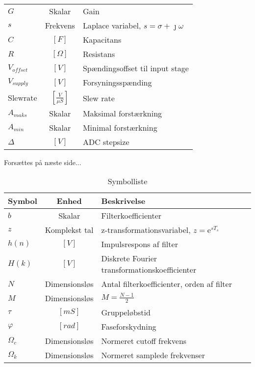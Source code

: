 \begin{table}[ht!]
\begin{threeparttable}
\begin{tabular}{l c p{}}
			$G$ & Skalar & Gain \\
			$s$ & Frekvens & Laplace variabel, $s = \sigma + \jmath \omega$ \\
			$C$ & $\left[\si{F}\right]$ & Kapacitans\\
			$R$ & $\left[\si{\Omega}\right]$ & Resistans\\
			$V_{offset}$ & $\left[\si{V}\right]$ & Spændingsoffset til input stage \\
			$V_{supply}$ & $\left[\si{V}\right]$ & Forsyningsspænding \\
			$\mathrm{Slew rate}$ & $\left[\si{\frac{V}{\mu S}}\right]$ & Slew rate \\
			$A_{maks}$ & Skalar & Maksimal forstærkning \\
			$A_{min}$ & Skalar & Minimal forstærkning\\
			$\Delta$ & $\left[\si{V}\right]$ & ADC stepsize\\
		
		\end{tabular}
	\begin{tablenotes}
		\item[] Forsættes på næste side...
	\end{tablenotes}
	\end{threeparttable}
\end{table}

\begin{table}[ht!]
	\caption{Symbolliste}
	\label{tab:symbolliste2}
	\begin{threeparttable}
		\begin{tabular}{l c p{}}
			\toprule
			\textbf{Symbol}      &
			\textbf{Enhed} & \textbf{Beskrivelse} \\
			\midrule
				$b$ & Skalar & Filterkoefficienter \\
			$z$ & Komplekst tal & z-transformationsvariabel, $z = \mathrm{e}^{sT_s}$\\
			$h(n)$ & $\left[\si{V}\right]$ & Impulsrespons af filter \\
			$H(k)$ & $\left[\si{V}\right]$ & Diskrete Fourier transformationskoefficienter\\
			$N$ & Dimensionsløs & Antal filterkoefficienter, orden af filter\\
			$M$ & Dimensionsløs & $M = \frac{N - 1}{2}$\\
			$\tau$ & $\left[\si{mS}\right]$ & Gruppeløbstid\\
			$\varphi$ & $\left[\si{rad}\right]$ & Faseforskydning\\
			$\Omega_c$ & Dimensionsløs & Normeret cutoff frekvens\\
			$\Omega_k$ & Dimensionsløs & Normeret samplede frekvenser\\		
			
		\end{tabular}
	\end{threeparttable}
\end{table}
